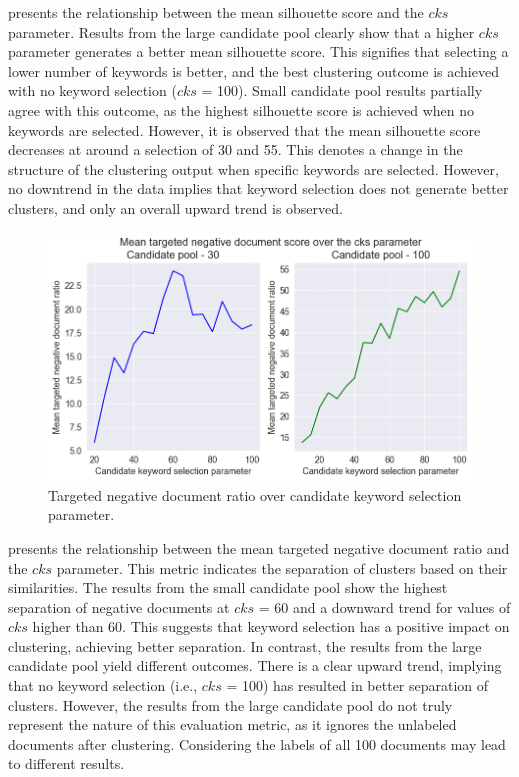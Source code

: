   presents the relationship between the mean silhouette score and the $cks$ parameter. Results from the large candidate pool clearly show that a higher $cks$ parameter generates a better mean silhouette score. This signifies that selecting a lower number of keywords is better, and the best clustering outcome is achieved with no keyword selection ($cks$ = 100). Small candidate pool results partially agree with this outcome, as the highest silhouette score is achieved when no keywords are selected. However, it is observed that the mean silhouette score decreases at around a selection of 30 and 55. This denotes a change in the structure of the clustering output when specific keywords are selected. However, no downtrend in the data implies that keyword selection does not generate better clusters, and only an overall upward trend is observed.

\begin{figure}[h]
	\centering
	\includegraphics[width=.99\textwidth]{images/subplots/csk_tfn_score_subplot.png}
	\caption[Targeted negative document ratio over cks parameter.]{Targeted negative document ratio over candidate keyword selection parameter.  \label{fig:target_function_vs_csk}}
\end{figure}

 presents the relationship between the mean targeted negative document ratio and the $cks$ parameter. This metric indicates the separation of clusters based on their similarities. The results from the small candidate pool show the highest separation of negative documents at $cks$ = 60 and a downward trend for values of $cks$ higher than 60. This suggests that keyword selection has a positive impact on clustering, achieving better separation. In contrast, the results from the large candidate pool yield different outcomes. There is a clear upward trend, implying that no keyword selection (i.e., $cks$ = 100) has resulted in better separation of clusters. However, the results from the large candidate pool do not truly represent the nature of this evaluation metric, as it ignores the unlabeled documents after clustering. Considering the labels of all 100 documents may lead to different results.

